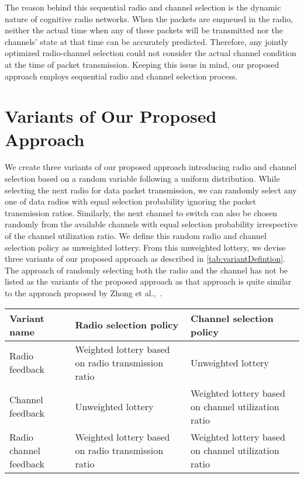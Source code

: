 The reason behind this sequential radio and channel selection is the dynamic nature of cognitive radio networks. When the packets are enqueued in the radio, neither the actual time when any of these packets will be transmitted nor the channels' state at that time can be accurately predicted. Therefore, any jointly optimized radio-channel selection could not consider the actual channel condition at the time of packet transmission. Keeping this issue in mind, our proposed approach employs sequential radio and channel selection process.

\section{Variants of Our Proposed Approach}

We create three variants of our proposed approach introducing radio and channel selection based on a random variable following a uniform distribution. While selecting the next radio for data packet transmission, we can randomly select any one of data radios with equal selection probability ignoring the packet transmission ratios. Similarly, the next channel to switch can also be chosen randomly from the available channels with equal selection probability irrespective of the channel utilization ratio. We define this random radio and channel selection policy as unweighted lottery. From this unweighted lottery, we devise three variants of our proposed approach as described in \cref{tab:variantDefintion}. The approach of randomly selecting both the radio and the channel has not be listed as the variants of the proposed approach as that approach is quite similar to the approach proposed by Zhong et al.,~\cite{zhong2014capacity}.

\begin{table*}
\begin{center}
  \caption{Several variants of the proposed feedback-based approach}
  \label{tab:variantDefintion}
  \begin{tabular}{p{}p{}p{}}
    \toprule
    Variant name & Radio selection policy & Channel selection policy\\
    \midrule
    Radio feedback & Weighted lottery based on radio transmission ratio & Unweighted lottery \\
    Channel feedback & Unweighted lottery  & Weighted lottery based on channel utilization ratio \\
    Radio channel feedback & Weighted lottery based on radio transmission ratio & Weighted lottery based on channel utilization ratio \\
    \bottomrule
  \end{tabular}
\end{center}
\vspace{-0.8cm}
\end{table*}
\endinput
